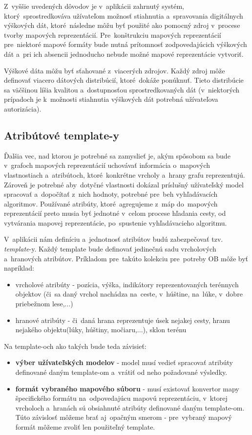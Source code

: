 Z~vyššie uvedených dôvodov je v~aplikácii zahrnutý systém, ktorý~sprostredkováva užívateľom možnosť stiahnutia a~spravovania digitálnych výškových dát, ktoré~následne môžu byť použité ako pomocný zdroj v~procese tvorby mapových reprezentácií. Pre~konštrukciu mapových reprezentácií pre~niektoré mapové formáty bude nutná prítomnosť zodpovedajúcich výškových dát a~pri ich absencii jednoducho nebude možné mapové reprezentácie vytvoriť.

Výškové dáta môžu byť sťahované z~viacerých zdrojov. Každý zdroj môže definovať viacero dátových distribúcií, ktoré~dokáže ponúknuť. Tieto distribúcie sa väčšinou líšia kvalitou a~dostupnosťou sprostredkovaných dát (v~niektorých prípadoch je k~možnosti stiahnutia výškových dát potrebná užívateľova autorizácia).

\subsection{Atribútové template-y}\label{templatey}

Ďalšia vec, nad ktorou je potrebné sa zamyslieť je, akým spôsobom sa bude v~grafoch mapových reprezentácií uchovávať informácia o~mapových vlastnostiach a~atribútoch, ktoré~konkrétne vrcholy a~hrany grafu reprezentujú. Zároveň je potrebné aby~dotyčné vlastnosti dokázal príslušný užívateľský model spracovať a~dopočítať z~nich hodnoty, potrebné pre~beh vyhľadávacích algoritmov. Používané atribúty, ktoré~agregujeme z~máp do~mapových reprezentácií preto musia byť jednotné v~celom procese hľadania cesty, od vytvárania mapovej reprezentácie, po~spustenie vyhľadávacieho algoritmu.

V~aplikácii nám definíciu a~jednotnosť atribútov budú zabezpečovať tzv. \textit{template}-y. Každý template bude definovať jedinečnú sadu vrcholových a~hranových atribútov. Príkladom pre~takúto kolekciu pre~potreby OB môže byť napríklad:
\begin{itemize}
    \item vrcholové atribúty - pozícia, výška, indikátory reprezentovaných terénnych objektov (či~sa daný vrchol nachádza na~ceste, v~húštine, na~lúke, v~dobre priebežnom lese,...)
    \item hranové atribúty - či~daná hrana reprezentuje úsek nejakej cesty, hranu nejakého objektu(lúky, húštiny, močiaru,...), sklon terénu
\end{itemize}

Na template-och ako takých bude teda závisieť: 
\begin{itemize}
    \item \textbf{výber užívateľských modelov} - model musí vedieť spracovať atribúty definované daným template-om a~vrátiť od neho požadované výsledky.
    \item \textbf{formát vybraného mapového súboru} - musí existovať konvertor mapy špecifického formátu na~odpovedajúcu mapovú reprezentáciu, v~ktorej vrcholoch a~hranách sú obsiahnuté atribúty definované daným template-om. Túto závislosť môžeme brať aj~opačným smerom - pre~vybraný mapový formát môžeme zvoliť len použiteľný template.
\end{itemize}

